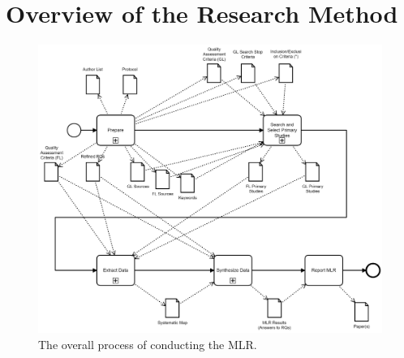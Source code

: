 \documentclass[review]{elsarticle}
\begin{document}
\section{Overview of the Research Method}
\label{sec:overview-of-the-process}

\begin{figure}
	\includegraphics[width=\linewidth]{graphics/process}
	\caption[The MLR process]{The overall process of conducting the MLR.}
	\label{fig:process}
\end{figure}
\end{document}
